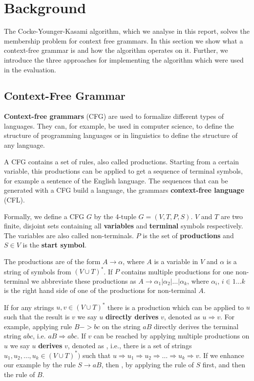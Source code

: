 \section{Background}
\label{sec:backgrund}

The Cocke-Younger-Kasami algorithm, which we analyse in this report, solves the membership problem for context free grammars.
In this section we show what a context-free grammar is and how the algorithm operates on it.
Further, we introduce the three approaches for implementing the algorithm which were used in the evaluation.

\subsection{Context-Free Grammar}
\textbf{Context-free grammars} (CFG) are used to formalize different types of languages.
They can, for example, be used in computer science, to define the structure of programming languages or in linguistics to define the structure of any language.

A CFG contains a set of rules, also called productions.
Starting from a certain variable, this productions can be applied to get a sequence of terminal symbols, for example a sentence of the English language.
The sequences that can be generated with a CFG build a language, the grammars \textbf{context-free language} (CFL).

Formally, we define a CFG $G$ by the 4-tuple $G=(V,T,P,S)$.
$V$ and $T$ are two finite, disjoint sets containing all \textbf{variables} and \textbf{terminal} symbols respectively.
The variables are also called non-terminals.
$P$ is the set of \textbf{productions} and $S\in V$ is the \textbf{start symbol}.

The productions are of the form $A\rightarrow\alpha$, where $A$ is a variable in $V$ and $\alpha$ is a string of symbols from $(V\cup T)^*$.
If $P$ contains multiple productions for one non-terminal we abbreviate these productions as $A\rightarrow \alpha_1 | \alpha_2 | \dots |\alpha_k $, where $\alpha_i$, $i\in {1\dots k}$ is the right hand side of one of the productions for non-terminal $A$.

If for any strings $u,v\in (V\cup T)^*$ there is a production which can be applied to $u$ such that the result is $v$ we say $u$ \textbf{directly derives} $v$, denoted as $u\Rightarrow v$.
For example, applying rule $B->bc$ on the string $aB$ directly derives the terminal string $abc$, i.e. $aB \Rightarrow abc$.
If $v$ can be reached by applying multiple productions on $u$ we say $u$ \textbf{derives} $v$, denoted as , i.e., there is a set of strings $u_1, u_2, \dots, u_k\in (V\cup T)^*)$ such that $u\Rightarrow u_1 \Rightarrow u_2 \Rightarrow \dots \Rightarrow u_k \Rightarrow v$.
If we enhance our example by the rule $S\rightarrow aB$, then , by applying the rule of $S$ first, and then the rule of $B$.

